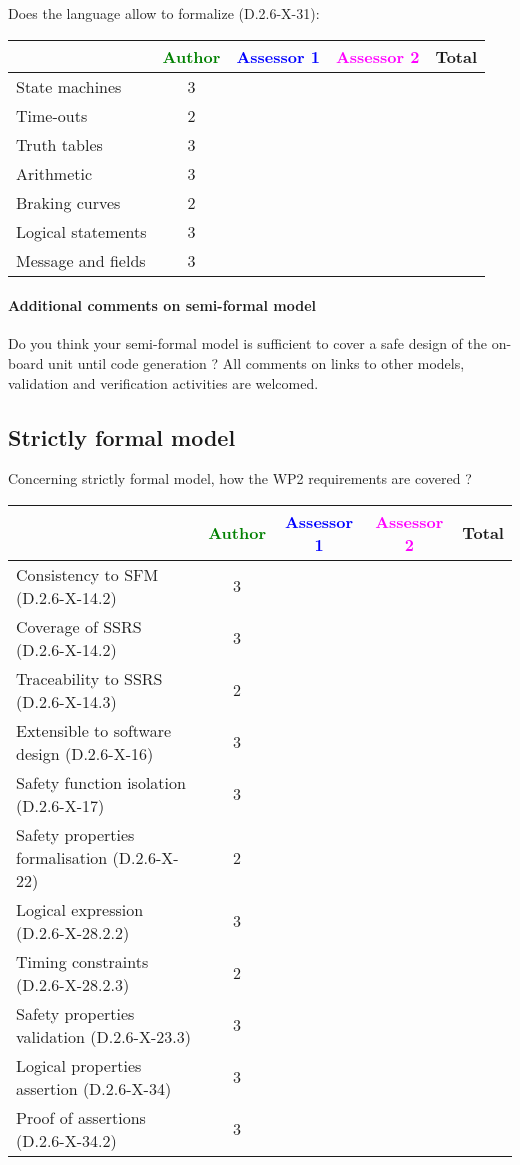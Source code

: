 Does the language allow to  formalize (D.2.6-X-31):

\begin{tabular}{|l | c | c | c | c|}
\hline
& \textcolor{green}{Author} & \textcolor{blue}{Assessor 1} & \textcolor{magenta}{Assessor 2} & Total \\
\hline 
State machines  & 3 & & &  \\
\hline
Time-outs  & 2 & & &  \\
\hline
Truth tables  & 3 & & &  \\
\hline
Arithmetic  & 3 & & &  \\
\hline
Braking curves  & 2 & & &  \\
\hline
Logical statements & 3 & & &  \\
\hline
Message and fields & 3 & & &  \\
\hline
\end{tabular}

\paragraph{Additional comments on semi-formal  model} Do you think your semi-formal  model is sufficient to cover a safe design of the on-board unit until code generation ?
All comments on links to  other models, validation and verification activities are welcomed.

\subsection{Strictly formal model}

Concerning strictly formal model, how the WP2 requirements are covered ?

\begin{tabular}{|l | c | c | c | c|}
\hline
& \textcolor{green}{Author} & \textcolor{blue}{Assessor 1} & \textcolor{magenta}{Assessor 2} & Total \\
\hline 
Consistency to SFM (D.2.6-X-14.2) & 3 & & &  \\
\hline
Coverage of SSRS (D.2.6-X-14.2)  & 3 & & &  \\
\hline
Traceability to  SSRS (D.2.6-X-14.3)  & 2 & & &  \\
\hline
Extensible to software design (D.2.6-X-16)  & 3 & & &  \\
\hline
Safety function isolation (D.2.6-X-17)  & 3 & & &  \\
\hline 
Safety properties formalisation (D.2.6-X-22)  & 2 & & &  \\
\hline
Logical expression (D.2.6-X-28.2.2)  & 3 & & &  \\
\hline
Timing constraints (D.2.6-X-28.2.3)  & 2 & & &  \\
\hline
Safety properties validation (D.2.6-X-23.3)  & 3 & & &  \\
\hline
Logical properties assertion (D.2.6-X-34)  & 3 & & &  \\
\hline
Proof of assertions (D.2.6-X-34.2)  & 3 & & &  \\
\hline
\end{tabular}

